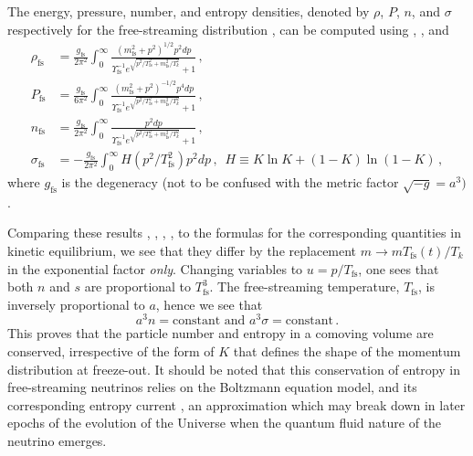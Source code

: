 The energy, pressure, number, and entropy densities, denoted by $\rho$, $P$, $n$, and $\sigma$ respectively for the free-streaming distribution , can be computed using , , and 
\begin{align}
\rho_\mathrm{fs}&=\frac{g_\mathrm{fs}}{2\pi^2}\!\int_0^\infty\!\!\!\frac{\left(m_\mathrm{fs}^2+p^2\right)^{1/2}p^2dp }{\Upsilon_\mathrm{fs}^{-1}e^{\sqrt{p^2/T_\mathrm{fs}^2+m_\mathrm{fs}^2/T_k^2}}+ 1}\,,\label{eq:NeutrinoRho}\\[0.2cm]
P_\mathrm{fs}&=\frac{g_\mathrm{fs}}{6\pi^2}\!\int_0^\infty\!\!\!\frac{\left(m_\mathrm{fs}^2+p^2\right)^{-1/2}p^4dp }{\Upsilon_\mathrm{fs}^{-1} e^{\sqrt{p^2/T_\mathrm{fs}^2+m_\mathrm{fs}^2/T_k^2}}+ 1}\,,\label{eq:NeutrinoP}\\[0.2cm]
n_\mathrm{fs}&=\frac{g_\mathrm{fs}}{2\pi^2}\!\int_0^\infty\!\!\!\frac{p^2dp }{\Upsilon_\mathrm{fs}^{-1}e^{\sqrt{p^2/T_\mathrm{fs}^2+m_\mathrm{fs}^2/T_k^2}}+ 1}\,,\label{eq:NumDensity}\\[0.3cm]
\sigma_\mathrm{fs}&=-\frac{g_\mathrm{fs}}{2\pi^2}\!\int_0^\infty\!\!\!H(p^2/T_\mathrm{fs}^2)p^2dp\,,\,\,\,H\equiv K\ln K +(1-K)\ln(1-K)\,,\label{eq:EntropyIntegrand}
\end{align}
where $g_\mathrm{fs}$ is the degeneracy (not to be confused with the metric factor $\sqrt{-g}=a^3)$.

Comparing these results , , , , to the formulas for the corresponding quantities in kinetic equilibrium, we see that they differ by the replacement $m\rightarrow m T_\mathrm{fs}(t)/T_k$ in the exponential factor {\em only}. Changing variables to $u=p/T_\mathrm{fs}$, one sees that both $n$ and $s$ are proportional to $T_\mathrm{fs}^3$. The  free-streaming temperature, $T_\mathrm{fs}$, is inversely proportional to $a$, hence we see that
\begin{equation}\label{eq:ConstEntropy}
a^3n=\text{constant}\text{ and } a^3\sigma=\text{constant}\,.
\end{equation}
This proves that the particle number and entropy in a comoving volume are conserved, irrespective of the form of $K$ that defines the shape of the momentum distribution at freeze-out. It should be noted that this conservation of entropy in free-streaming neutrinos relies on the Boltzmann equation model, and its corresponding entropy current , an approximation which may break down in later epochs of the evolution of the Universe when the quantum fluid nature of the neutrino emerges. 

